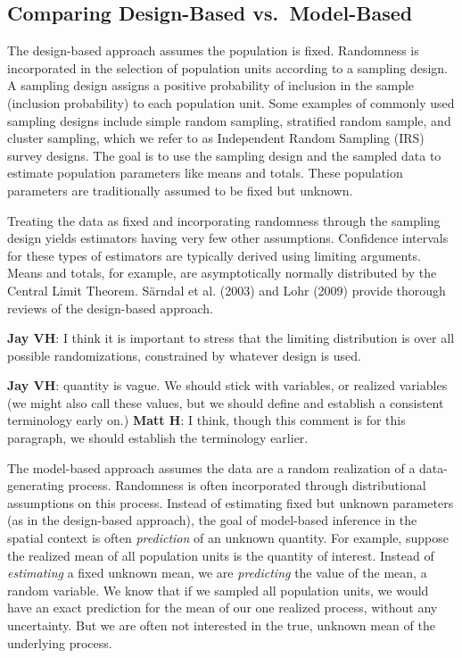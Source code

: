 \documentclass[]{elsarticle} %
\begin{document}
\hypertarget{comparing-design-based-vs.-model-based}{%
\subsection{Comparing Design-Based
vs.~Model-Based}\label{comparing-design-based-vs.-model-based}}

The design-based approach assumes the population is fixed. Randomness is
incorporated in the selection of population units according to a
sampling design. A sampling design assigns a positive probability of
inclusion in the sample (inclusion probability) to each population unit.
Some examples of commonly used sampling designs include simple random
sampling, stratified random sample, and cluster sampling, which we refer
to as Independent Random Sampling (IRS) survey designs. The goal is to
use the sampling design and the sampled data to estimate population
parameters like means and totals. These population parameters are
traditionally assumed to be fixed but unknown.

Treating the data as fixed and incorporating randomness through the
sampling design yields estimators having very few other assumptions.
Confidence intervals for these types of estimators are typically derived
using limiting arguments. Means and totals, for example, are
asymptotically normally distributed by the Central Limit Theorem.
Särndal et al. (2003) and Lohr (2009) provide thorough reviews of the
design-based approach.

\textbf{Jay VH}: I think it is important to stress that the limiting
distribution is over all possible randomizations, constrained by
whatever design is used.

\textbf{Jay VH}: quantity is vague. We should stick with variables, or
realized variables (we might also call these values, but we should
define and establish a consistent terminology early on.) \textbf{Matt
H}: I think, though this comment is for this paragraph, we should
establish the terminology earlier.

The model-based approach assumes the data are a random realization of a
data-generating process. Randomness is often incorporated through
distributional assumptions on this process. Instead of estimating fixed
but unknown parameters (as in the design-based approach), the goal of
model-based inference in the spatial context is often \emph{prediction}
of an unknown quantity. For example, suppose the realized mean of all
population units is the quantity of interest. Instead of
\emph{estimating} a fixed unknown mean, we are \emph{predicting} the
value of the mean, a random variable. We know that if we sampled all
population units, we would have an exact prediction for the mean of our
one realized process, without any uncertainty. But we are often not
interested in the true, unknown mean of the underlying process.
\end{document}
